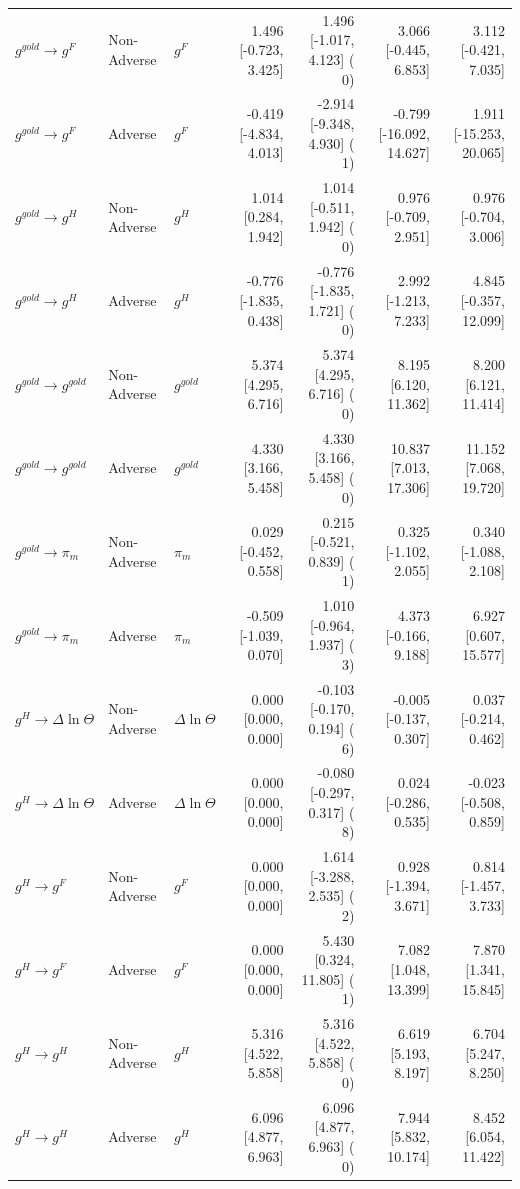 \begin{table}[htbp]
{\begin{tabular}{lllrrrr}
$g^{gold} \to g^F$ & Non-Adverse & $g^F$ & 1.496 [-0.723, 3.425] & 1.496 [-1.017, 4.123] ( 0) & 3.066 [-0.445, 6.853] & 3.112 [-0.421, 7.035] \\
$g^{gold} \to g^F$ & Adverse & $g^F$ & -0.419 [-4.834, 4.013] & -2.914 [-9.348, 4.930] ( 1) & -0.799 [-16.092, 14.627] & 1.911 [-15.253, 20.065] \\
$g^{gold} \to g^H$ & Non-Adverse & $g^H$ & 1.014 [0.284, 1.942] & 1.014 [-0.511, 1.942] ( 0) & 0.976 [-0.709, 2.951] & 0.976 [-0.704, 3.006] \\
$g^{gold} \to g^H$ & Adverse & $g^H$ & -0.776 [-1.835, 0.438] & -0.776 [-1.835, 1.721] ( 0) & 2.992 [-1.213, 7.233] & 4.845 [-0.357, 12.099] \\
$g^{gold} \to g^{gold}$ & Non-Adverse & $g^{gold}$ & 5.374 [4.295, 6.716] & 5.374 [4.295, 6.716] ( 0) & 8.195 [6.120, 11.362] & 8.200 [6.121, 11.414] \\
$g^{gold} \to g^{gold}$ & Adverse & $g^{gold}$ & 4.330 [3.166, 5.458] & 4.330 [3.166, 5.458] ( 0) & 10.837 [7.013, 17.306] & 11.152 [7.068, 19.720] \\
$g^{gold} \to \pi_m$ & Non-Adverse & $\pi_m$ & 0.029 [-0.452, 0.558] & 0.215 [-0.521, 0.839] ( 1) & 0.325 [-1.102, 2.055] & 0.340 [-1.088, 2.108] \\
$g^{gold} \to \pi_m$ & Adverse & $\pi_m$ & -0.509 [-1.039, 0.070] & 1.010 [-0.964, 1.937] ( 3) & 4.373 [-0.166, 9.188] & 6.927 [0.607, 15.577] \\
$g^H \to \Delta\ln\Theta$ & Non-Adverse & $\Delta\ln\Theta$ & 0.000 [0.000, 0.000] & -0.103 [-0.170, 0.194] ( 6) & -0.005 [-0.137, 0.307] & 0.037 [-0.214, 0.462] \\
$g^H \to \Delta\ln\Theta$ & Adverse & $\Delta\ln\Theta$ & 0.000 [0.000, 0.000] & -0.080 [-0.297, 0.317] ( 8) & 0.024 [-0.286, 0.535] & -0.023 [-0.508, 0.859] \\
$g^H \to g^F$ & Non-Adverse & $g^F$ & 0.000 [0.000, 0.000] & 1.614 [-3.288, 2.535] ( 2) & 0.928 [-1.394, 3.671] & 0.814 [-1.457, 3.733] \\
$g^H \to g^F$ & Adverse & $g^F$ & 0.000 [0.000, 0.000] & 5.430 [0.324, 11.805] ( 1) & 7.082 [1.048, 13.399] & 7.870 [1.341, 15.845] \\
$g^H \to g^H$ & Non-Adverse & $g^H$ & 5.316 [4.522, 5.858] & 5.316 [4.522, 5.858] ( 0) & 6.619 [5.193, 8.197] & 6.704 [5.247, 8.250] \\
$g^H \to g^H$ & Adverse & $g^H$ & 6.096 [4.877, 6.963] & 6.096 [4.877, 6.963] ( 0) & 7.944 [5.832, 10.174] & 8.452 [6.054, 11.422] \\

\end{tabular}}
\end{table}
